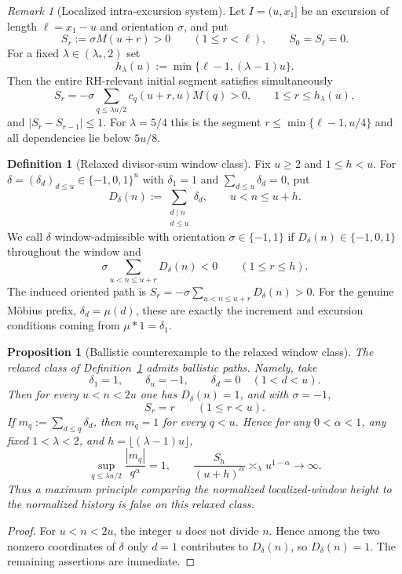 \documentclass[11pt]{amsart}
\numberwithin{equation}{section}
\theoremstyle{plain}
\newtheorem{proposition}[theorem]{Proposition}
\theoremstyle{definition}
\newtheorem{definition}[theorem]{Definition}
\theoremstyle{remark}
\newtheorem{remark}[theorem]{Remark}
\begin{document}
\begin{remark}[Localized intra-excursion system]
\label{rem:sign-cone}
Let $I=(u,x_1]$ be an excursion of length $\ell=x_1-u$ and orientation
$\sigma$, and put
\[
S_r:=\sigma M(u+r)>0\qquad(1\le r<\ell),\qquad S_0=S_\ell=0.
\]
For a fixed $\lambda\in(\lambda_*,2)$ set
\[
h_\lambda(u):=\min\{\ell-1,(\lambda-1)u\}.
\]
Then the entire RH-relevant initial segment satisfies simultaneously
\[
S_r=-\sigma\sum_{q\le\lambda u/2}c_q(u+r,u)M(q)>0,
\qquad1\le r\le h_\lambda(u),
\]
and $|S_r-S_{r-1}|\le1$.  For $\lambda=5/4$ this is the segment
$r\le\min\{\ell-1,u/4\}$ and all dependencies lie below $5u/8$.
\end{remark}

\begin{definition}[Relaxed divisor-sum window class]
\label{def:relaxed-divisor-cone}
Fix $u\ge2$ and $1\le h<u$.  For
$\delta=(\delta_d)_{d\le u}\in\{-1,0,1\}^u$ with $\delta_1=1$ and
$\sum_{d\le u}\delta_d=0$, put
\[
D_\delta(n):=\sum_{\substack{d\mid n\\ d\le u}}\delta_d,
\qquad u<n\le u+h.
\]
We call $\delta$ window-admissible with orientation $\sigma\in\{-1,1\}$ if
$D_\delta(n)\in\{-1,0,1\}$ throughout the window and
\[
\sigma\sum_{u<n\le u+r}D_\delta(n)<0
\qquad(1\le r\le h).
\]
The induced oriented path is
$S_r=-\sigma\sum_{u<n\le u+r}D_\delta(n)>0$.
For the genuine M\"obius prefix, $\delta_d=\mu(d)$, these are exactly the
increment and excursion conditions coming from $\mu*1=\delta_1$.
\end{definition}

\begin{proposition}[Ballistic counterexample to the relaxed window class]
\label{prop:relaxed-ballistic}
The relaxed class of Definition~\ref{def:relaxed-divisor-cone} admits
ballistic paths.  Namely, take
\[
\delta_1=1,\qquad\delta_u=-1,\qquad\delta_d=0\quad(1<d<u).
\]
Then for every $u<n<2u$ one has $D_\delta(n)=1$, and with $\sigma=-1$,
\[
S_r=r\qquad(1\le r<u).
\]
If $m_q:=\sum_{d\le q}\delta_d$, then $m_q=1$ for every $q<u$.  Hence for
any $0<\alpha<1$, any fixed $1<\lambda<2$, and
$h=\lfloor(\lambda-1)u\rfloor$,
\[
\sup_{q\le\lambda u/2}\frac{|m_q|}{q^\alpha}=1,
\qquad
\frac{S_h}{(u+h)^\alpha}\asymp_\lambda u^{1-\alpha}\longrightarrow\infty.
\]
Thus a maximum principle comparing the normalized localized-window height
to the normalized history is false on this relaxed class.
\end{proposition}

\begin{proof}
For $u<n<2u$, the integer $u$ does not divide $n$.  Hence among the two
nonzero coordinates of $\delta$ only $d=1$ contributes to $D_\delta(n)$,
so $D_\delta(n)=1$.  The remaining assertions are immediate.
\end{proof}
\end{document}
